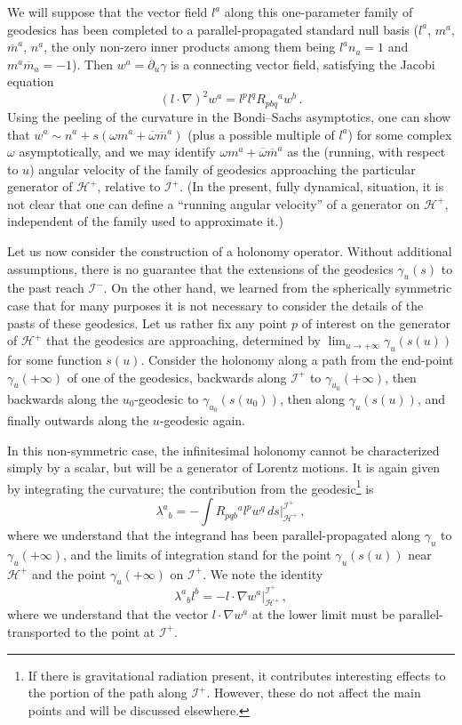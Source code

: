 \documentclass[
%
draft    %
,numberedheadings 
,bibliocites
  ]
  {aipproc}
\newcommand{\scrif}{{{\mathscr I}^{+}}}
\newcommand{\scrip}{{{\mathscr I}^{-}}}
\newcommand{\Hf}{{{\mathscr H}^{+}}} %
\begin{document}
We will suppose that the vector field $l^a$ along this 
one-parameter family of geodesics has been completed to a
parallel-propagated standard null basis ($l^a$, $m^a$, ${\overline m}^a$, $n^a$, the only 
non-zero inner products among them being $l^an_a=1$ and $m^a{\overline m}_a=-1$).  Then $w^a=\partial _u\gamma$ is a connecting vector field, satisfying the Jacobi equation
\begin{equation}
  (l\cdot\nabla )^2w^a=l^pl^qR_{pbq}{}^aw^b\, .
\end{equation}
Using the peeling of the curvature in the Bondi--Sachs asymptotics, one can show that $w^a\sim n^a +s(\omega  m^a +\overline\omega {\overline m}^a)$ (plus a possible multiple of $l^a$) for some complex $\omega$ asymptotically, and we may identify 
$\omega  m^a +\overline\omega  {\overline m}^a$ as the (running, with respect to $u$) angular velocity of the
family of geodesics approaching the particular generator of $\Hf$, relative to $\scrif$.  (In the present, fully dynamical, situation, it is not clear that one can define a ``running angular velocity'' of a generator on $\Hf$, independent of the family used to approximate it.)

Let us now consider the construction of a holonomy operator.  
Without additional assumptions, there is no guarantee that the extensions of the geodesics $\gamma _u(s)$ to the past reach $\scrip$.  On the other hand, we learned from the spherically symmetric case that for many purposes it is not necessary to consider the details of the pasts of these geodesics.  Let us rather fix any point $p$ of interest on the generator of $\Hf$ that the geodesics are approaching, determined by $\lim _{u\to +\infty}\gamma _u(s(u))$ for some function $s(u)$.  
Consider the holonomy along a path from the 
end-point $\gamma _u(+\infty )$ of one of the geodesics, backwards along $\scrif$ to $\gamma _{u_0}(+\infty )$, then backwards along the $u_0$-geodesic to $\gamma _{u_0}(s(u_0))$, then along $\gamma _u(s(u))$, and finally outwards along the $u$-geodesic again.

In this non-symmetric case, the infinitesimal holonomy cannot be characterized simply by a scalar, but will be a generator of Lorentz motions.  It is again given by integrating the curvature; the contribution from the geodesic\footnote{If there is gravitational radiation present, it contributes interesting effects to the portion of the path along $\scrif$.  However, these do not affect the main points and will be discussed elsewhere.}
is
\begin{equation}
  \lambda ^a{}_b=-\int R_{pqb}{}^al^p w^q\, ds\Bigr| _\Hf ^\scrif\, ,
\end{equation}
where we understand that the integrand has been parallel-propagated along $\gamma _u$ to $\gamma _u(+\infty )$, and the limits of integration stand for the point $\gamma _u(s(u))$ near $\Hf$ and the point $\gamma _u(+\infty )$ on $\scrif$.
We note the identity 
\begin{equation}\label{lambdident}
  \lambda ^a{}_b l^b=-l\cdot\nabla w^a\Bigr| _\Hf ^\scrif\, ,
\end{equation}
where
we understand that the vector $l\cdot\nabla w^a$ at
the lower limit must be parallel-transported to the point at $\scrif$.
\end{document}
